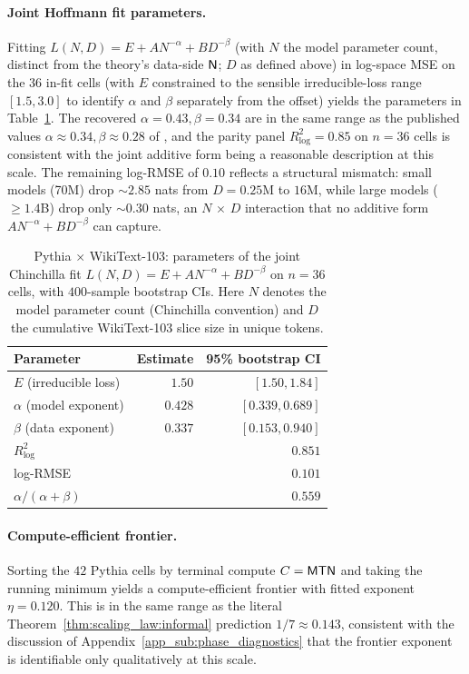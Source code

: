\documentclass[11pt]{article}
\let\citet\citep
\theoremstyle{plain}
\newcommand{\myvspace}[1]{\ifdefined\isarxiv\else\vspace{#1}\fi}
\begin{document}
\paragraph{Joint Hoffmann fit parameters.} Fitting $L(N, D)=E+A N^{-\alpha}+B D^{-\beta}$ (with $N$ the model parameter count, distinct from the theory's data-side ${\sf N}$; $D$ as defined above) in log-space MSE on the $36$ in-fit cells (with $E$ constrained to the sensible irreducible-loss range $[1.5, 3.0]$ to identify $\alpha$ and $\beta$ separately from the offset) yields the parameters in Table~\ref{tab:hoffmann_fit}. The recovered $\alpha\!=\!0.43, \beta\!=\!0.34$ are in the same range as the published values $\alpha\approx 0.34, \beta\approx 0.28$ of \citet{hbm+22}, and the parity panel $R^2_{\log}\!=\!0.85$ on $n=36$ cells is consistent with the joint additive form being a reasonable description at this scale. The remaining log-RMSE of $0.10$ reflects a structural mismatch: small models (70M) drop $\sim\!2.85$ nats from $D\!=\!0.25$M to $16$M, while large models ($\ge 1.4$B) drop only $\sim\!0.30$ nats, an $N\,\times\,D$ interaction that no additive form $A N^{-\alpha}+B D^{-\beta}$ can capture.

\begin{table}[h]
\centering
\caption{Pythia $\times$ WikiText-103: parameters of the joint Chinchilla fit $L(N, D)=E+A N^{-\alpha}+B D^{-\beta}$ on $n=36$ cells, with $400$-sample bootstrap CIs. Here $N$ denotes the model parameter count (Chinchilla convention) and $D$ the cumulative WikiText-103 slice size in unique tokens.}
\label{tab:hoffmann_fit}
\myvspace{-1mm}
{\scriptsize
\begin{tabular}{@{}lrr@{}}
\toprule
Parameter & Estimate & 95\% bootstrap CI \\
\midrule
$E$ (irreducible loss)        & $1.50$  & $[1.50, 1.84]$ \\
$\alpha$ (model exponent)     & $0.428$ & $[0.339, 0.689]$ \\
$\beta$ (data exponent)       & $0.337$ & $[0.153, 0.940]$ \\
\midrule
$R^2_{\log}$                  & \multicolumn{2}{r}{$0.851$} \\
log-RMSE                      & \multicolumn{2}{r}{$0.101$} \\
$\alpha/(\alpha+\beta)$       & \multicolumn{2}{r}{$0.559$} \\
\bottomrule
\end{tabular}}
\end{table}

\paragraph{Compute-efficient frontier.} Sorting the $42$ Pythia cells by terminal compute $C={\sf MTN}$ and taking the running minimum yields a compute-efficient frontier with fitted exponent $\eta=0.120$. This is in the same range as the literal Theorem~\ref{thm:scaling_law:informal} prediction $1/7\approx 0.143$, consistent with the discussion of Appendix~\ref{app_sub:phase_diagnostics} that the frontier exponent is identifiable only qualitatively at this scale.
\end{document}
